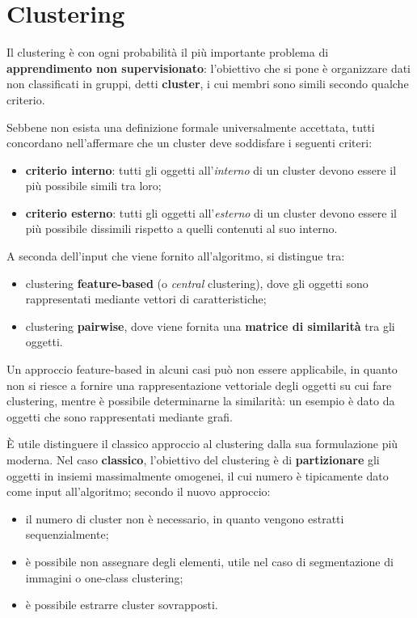 
\chapter{Clustering}
\label{cha:clustering}

Il clustering è con ogni probabilità il più importante problema di \textbf{apprendimento non supervisionato}: l'obiettivo che si pone è organizzare dati non classificati in gruppi, detti \textbf{cluster}, i cui membri sono simili secondo qualche criterio.

Sebbene non esista una definizione formale universalmente accettata, tutti concordano nell'affermare che un cluster deve soddisfare i seguenti criteri:
\begin{itemize}
	\item \textbf{criterio interno}: tutti gli oggetti all'\emph{interno} di un cluster devono essere il più possibile simili tra loro;
	\item \textbf{criterio esterno}: tutti gli oggetti all'\emph{esterno} di un cluster devono essere il più possibile dissimili rispetto a quelli contenuti al suo interno.
\end{itemize}
A seconda dell'input che viene fornito all'algoritmo, si distingue tra:
\begin{itemize}
	\item clustering \textbf{feature-based} (o \emph{central} clustering), dove gli oggetti sono rappresentati mediante vettori di caratteristiche;
	\item clustering \textbf{pairwise}, dove viene fornita una \textbf{matrice di similarità} tra gli oggetti.
\end{itemize}
Un approccio feature-based in alcuni casi può non essere applicabile, in quanto non si riesce a fornire una rappresentazione vettoriale degli oggetti su cui fare clustering, mentre è possibile determinarne la similarità: un esempio è dato da oggetti che sono rappresentati mediante grafi.

È utile distinguere il classico approccio al clustering dalla sua formulazione più moderna. Nel caso \textbf{classico}, l'obiettivo del clustering è di \textbf{partizionare} gli oggetti in insiemi massimalmente omogenei, il cui numero è tipicamente dato come input all'algoritmo; secondo il nuovo approccio:
\begin{itemize}
	\item il numero di cluster non è necessario, in quanto vengono estratti sequenzialmente;
	\item è possibile non assegnare degli elementi, utile nel caso di segmentazione di immagini o one-class clustering;
	\item è possibile estrarre cluster sovrapposti.
\end{itemize}

